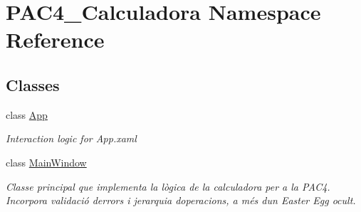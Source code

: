 \hypertarget{namespace_p_a_c4___calculadora}{}\section{P\+A\+C4\+\_\+\+Calculadora Namespace Reference}
\label{namespace_p_a_c4___calculadora}
\subsection*{Classes}
\begin{DoxyCompactItemize}
\item 
class \mbox{\hyperlink{class_p_a_c4___calculadora_1_1_app}{App}}
\begin{DoxyCompactList}\small\item\em Interaction logic for App.\+xaml \end{DoxyCompactList}\item 
class \mbox{\hyperlink{class_p_a_c4___calculadora_1_1_main_window}{Main\+Window}}
\begin{DoxyCompactList}\small\item\em Classe principal que implementa la lògica de la calculadora per a la P\+A\+C4. Incorpora validació d\textquotesingle{}errors i jerarquia d\textquotesingle{}operacions, a més d\textquotesingle{}un Easter Egg ocult. \end{DoxyCompactList}\end{DoxyCompactItemize}
